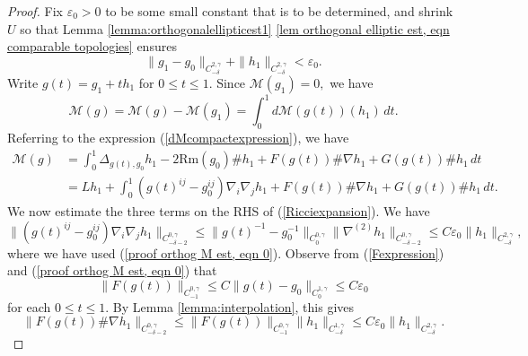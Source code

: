 \documentclass[12pt]{amsart}
\newcommand{\calM}{\mathcal{M}}
\renewcommand{\1}{{\mathbf 1}}
\newcommand{\Rm}{\mathrm{Rm}}
\newcommand{\eps}{{\varepsilon}}
\theoremstyle{others}
\numberwithin{equation}{section}
\begin{document}
\begin{proof} 
    Fix $\eps_0 > 0$ to be some small constant that is to be determined, and shrink $U$ so that Lemma \ref{lemma:orthogonalellipticest1} \eqref{lem orthogonal elliptic est, eqn comparable topologies} ensures 
    \begin{equation} \label{proof orthog M est, eqn 0}
        \| g_1 - g_0\|_{C^{2, \gamma}_{-\delta}} + \| h_1 \|_{C^{2, \gamma}_{-\delta} } < \eps_0.    
    \end{equation}
    Write %
    $g(t) = g_1 + t h_1$ for $0 \leq t \leq 1.$ Since $\calM(g_1) = 0,$ we have
    \begin{equation}
    \calM(g) = \calM(g) - \calM(g_1) = \int_0^1 d\calM(g(t))(h_1) \, dt. %
    \end{equation}
    Referring to the expression (\ref{dMcompactexpression}), we have%
    \begin{equation}\label{Ricciexpansion}
    \begin{split}
    \calM(g) &= \int_0^1 \Delta_{g(t), g_0} h_1 - 2 \Rm(g_0) \# h_1 + F(g(t)) \# \nabla h_1 + G(g(t)) \# h_1 \, dt \\
    & = L h_1 + \int_0^1 \left( g(t)^{ij} - g_0^{ij} \right) \nabla_i \nabla_j h_1 + F(g(t)) \# \nabla h_1 + G(g(t)) \# h_1 \, dt.
    \end{split}
    \end{equation}
    We now estimate the three terms on the RHS of (\ref{Ricciexpansion}). We have
    $$\| \left( g(t)^{ij} - g_0^{ij} \right) \nabla_i \nabla_j h_1 \|_{C^{0, \gamma}_{-\delta - 2}} \leq \| g(t)^{-1} - g_0^{-1} \|_{C^{0, \gamma}_0} \| \nabla^{(2)} h_1 \|_{C^{0, \gamma}_{-\delta - 2}} \leq C \eps_0 \| h_1 \|_{C^{2, \gamma}_{-\delta}},$$
    where we have used (\ref{proof orthog M est, eqn 0}).
    Observe from (\ref{Fexpression}) and (\ref{proof orthog M est, eqn 0}) that
    $$\|F(g(t)) \|_{C^{0, \gamma}_{-1}} \leq C \|g(t) - g_0 \|_{C^{1, \gamma}_0} \leq C \eps_0$$
    for each $0 \leq t \leq 1.$ By Lemma \ref{lemma:interpolation}, this gives
    $$\| F(g(t)) \# \nabla h_1 \|_{C^{0, \gamma}_{- \delta - 2}} \leq \|F(g(t)) \|_{C^{0, \gamma}_{-1}} \| h_1 \|_{C^{1, \gamma}_{-\delta}} \leq C \eps_0 \| h_1 \|_{C^{2, \gamma}_{-\delta}}.
    $$

\end{proof}
\end{document}
